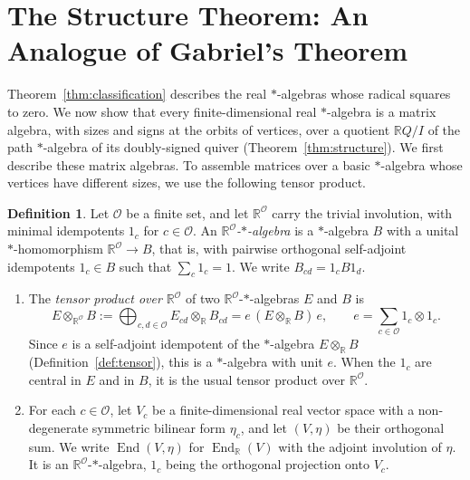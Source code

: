 \documentclass[12pt, a4paper]{report}
\theoremstyle{plain}
\theoremstyle{definition}
\newtheorem{definition}[theorem]{Definition}
\theoremstyle{remark}
\theoremstyle{plain}
\newcommand{\RR}{\mathbb{R}}
\DeclareMathOperator{\End}{End}
\begin{document}
\section{The Structure Theorem: An Analogue of Gabriel's Theorem}
\label{sec:structure}
Theorem~\ref{thm:classification} describes the real $*$-algebras whose radical squares to zero. We now show that every finite-dimensional real $*$-algebra is a matrix algebra, with sizes and signs at the orbits of vertices, over a quotient $\RR Q/I$ of the path $*$-algebra of its doubly-signed quiver (Theorem~\ref{thm:structure}). We first describe these matrix algebras. To assemble matrices over a basic $*$-algebra whose vertices have different sizes, we use the following tensor product.

\begin{definition}\label{def:matrix-like}
Let $\mathcal O$ be a finite set, and let $\RR^{\mathcal O}$ carry the trivial involution, with minimal idempotents $1_c$ for $c\in\mathcal O$. An \emph{$\RR^{\mathcal O}$-$*$-algebra} is a $*$-algebra $B$ with a unital $*$-homomorphism $\RR^{\mathcal O}\to B$, that is, with pairwise orthogonal self-adjoint idempotents $1_c\in B$ such that $\sum_c1_c=1$. We write $B_{cd}=1_cB1_d$.
\begin{enumerate}
  \item The \emph{tensor product over $\RR^{\mathcal O}$} of two $\RR^{\mathcal O}$-$*$-algebras $E$ and $B$ is
  \[ E\otimes_{\RR^{\mathcal O}}B:=\bigoplus_{c,d\in\mathcal O}E_{cd}\otimes_\RR B_{cd}=e\,(E\otimes_\RR B)\,e,\qquad e=\sum_{c\in\mathcal O}1_c\otimes1_c . \]
  Since $e$ is a self-adjoint idempotent of the $*$-algebra $E\otimes_\RR B$ (Definition~\ref{def:tensor}), this is a $*$-algebra with unit $e$. When the $1_c$ are central in $E$ and in $B$, it is the usual tensor product over $\RR^{\mathcal O}$.
  \item For each $c\in\mathcal O$, let $V_c$ be a finite-dimensional real vector space with a non-degenerate symmetric bilinear form $\eta_c$, and let $(V,\eta)$ be their orthogonal sum. We write $\End(V,\eta)$ for $\End_\RR(V)$ with the adjoint involution of $\eta$. It is an $\RR^{\mathcal O}$-$*$-algebra, $1_c$ being the orthogonal projection onto $V_c$.
\end{enumerate}
\end{definition}
\end{document}
